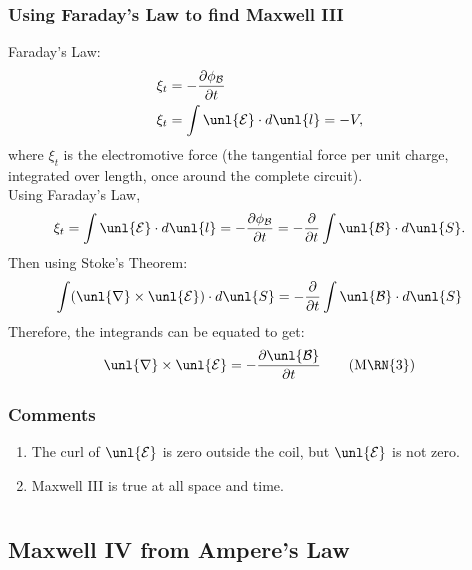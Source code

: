 \documentclass[a4paper, 11pt, normalem]{report}
\newcommand\p{\partial}
\newcommand\E{\mathcal{E}}
\newcommand\uE{\unl{\E}}
\newcommand\B{\mathcal{B}}
\newcommand\uB{\unl{\B}}
\newcommand\del{\unl{\nabla}}
\begin{document}
\subsection{Using Faraday's Law to find Maxwell \RN{3}}
Faraday's Law:
\begin{align*}
    \xi_t &= -\frac{\p \phi_\B}{\p t} \\
    \xi_t &= \int \uE \cdot d\unl{l} = -V,
\end{align*}
where $\xi_t$ is the electromotive force (the tangential force per unit charge, integrated over length, once around the complete circuit). \\
Using Faraday's Law,
\begin{equation*}
    \xi_t = \int \uE\cdot d\unl{l} = -\frac{\p \phi_\B}{\p t} = -\frac{\p}{\p t}\int \uB \cdot d\unl{S}.
\end{equation*}
Then using Stoke's Theorem:
\begin{equation*}
    \int (\del \times \uE) \cdot d\unl{S} = -\frac{\p}{\p t}\int \uB \cdot d\unl{S}
\end{equation*}
Therefore, the integrands can be equated to get:
\begin{equation}
    \del \times \uE = -\frac{\p \uB}{\p t} \tag{M\RN{3}}
\end{equation}

\subsection{Comments}
\begin{enumerate}
    \item The curl of $\uE$ is zero outside the coil, but $\uE$ is not zero.
    \item Maxwell \RN{3} is true at all space and time.
\end{enumerate}

\chapter{}
\section{Maxwell \RN{4} from Ampere's Law}
\end{document}
